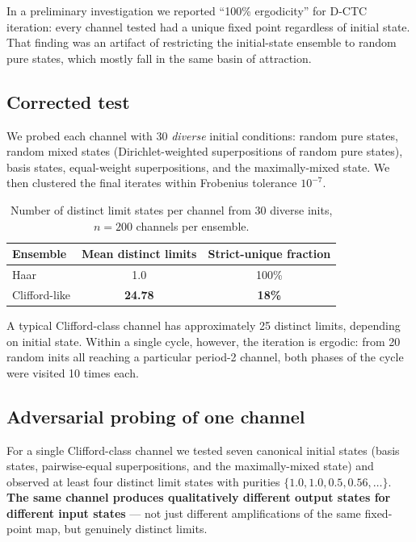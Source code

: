 \documentclass[11pt,a4paper]{article}
\begin{document}
In a preliminary investigation we reported ``100\% ergodicity'' for
D-CTC iteration: every channel tested had a unique fixed point
regardless of initial state. That finding was an artifact of
restricting the initial-state ensemble to random pure states, which
mostly fall in the same basin of attraction.

\subsection*{Corrected test}

We probed each channel with 30 \emph{diverse} initial conditions:
random pure states, random mixed states (Dirichlet-weighted
superpositions of random pure states), basis states, equal-weight
superpositions, and the maximally-mixed state. We then clustered the
final iterates within Frobenius tolerance $10^{-7}$.

\begin{table}[h]
\centering
\caption{Number of distinct limit states per channel from 30 diverse
inits, $n = 200$ channels per ensemble.}
\label{tab:multi-basin}
\begin{tabular}{lcc}
\toprule
Ensemble & Mean distinct limits & Strict-unique fraction \\
\midrule
Haar & 1.0 & 100\% \\
Clifford-like & \textbf{24.78} & \textbf{18\%} \\
\bottomrule
\end{tabular}
\end{table}

A typical Clifford-class channel has approximately 25 distinct
limits, depending on initial state. Within a single cycle, however,
the iteration is ergodic: from 20 random inits all reaching a
particular period-2 channel, both phases of the cycle were
visited 10 times each.

\subsection*{Adversarial probing of one channel}

For a single Clifford-class channel we tested seven canonical
initial states (basis states, pairwise-equal superpositions, and
the maximally-mixed state) and observed at least four distinct
limit states with purities $\{1.0, 1.0, 0.5, 0.56, \ldots\}$.
\textbf{The same channel produces qualitatively different output
states for different input states} --- not just different
amplifications of the same fixed-point map, but genuinely distinct
limits.
\end{document}
